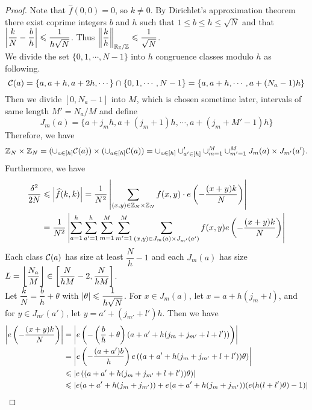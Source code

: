 \begin{proof}
	Note that $ \widehat{f}(0,0) = 0 $, so $ k \neq 0 $. By Dirichlet's approximation theorem there exist coprime integers $ b $ and $ h $ such that $ 1 \leq b \leq h \leq \sqrt{N} $ and that $ \left\vert{\dfrac{k}{N} - \dfrac{b}{h}}\right\vert \leqslant \dfrac{1}{h \sqrt{N}} $. Thus $ \left\| \dfrac{k}{h}\right\|_{{\mathbb R}_{\mathbb Z}/{\mathbb Z}} \leqslant \dfrac{1}{\sqrt{N}} $. \\
	We divide the set $ \{0, 1, \cdots, N-1\} $ into $ h $ congruence classes modulo $ h $ as following. 
	$$ {\mathcal C}(a) = \{a , a+h, a+ 2h, \cdots\} \cap \{0, 1, \cdots, N-1\} = \{a, a+h, \cdots, a+(N_a -1 )h \} $$
	Then we divide $ [0, N_a -1] $ into $ M $, which is chosen sometime later, intervals of same length $ M' = N_a/M $ and define
	$$ J_m(a) = \{a + j_m h , a+ (j_m +1)h, \cdots, a + (j_m + M' -1)h \} $$
	Therefore, we have 
	$$ {\mathbb Z}_N \times {\mathbb Z}_N = (\cup_{a \in [h]} {\mathcal C}(a)) \times (\cup_{a \in [h]} {\mathcal C}(a)) = \cup_{a \in [h]} \cup_{a' \in [h]}' \cup_{m =1}^{M} \cup_{m' = 1}^M J_m(a) \times J_{m'}(a'). $$
	Furthermore, we have 
	\begin{align*}
		\dfrac{\delta^2}{2N} &\leq \abs{\widehat{f}(k,k)} = \dfrac{1}{N^2} \abs{\sum\limits_{(x,y) \in \bbZ_N \times \bbZ_N}  f(x,y) \cdot e\left(-\dfrac{(x+y)k}{N}\right)}\\
		& = \dfrac{1}{N^2} \abs{\sum\limits_{a = 1}^h \sum\limits_{a' = 1} ^h \sum\limits_{m = 1}^M \sum\limits_{m' = 1}^M \sum\limits_{(x,y) \in J_m(a) \times J_{m'}(a')} f(x,y) e\left(-\dfrac{(x+y)k}{N}\right)}
	\end{align*}
	Each class $ {\mathcal C}(a) $ has size at least $ \dfrac{N}{h} -1 $ and each $ J_m(a) $ has size $ L = \left\lfloor{\dfrac{N_a}{M}}\right\rfloor \in \left[\dfrac{N}{hM} - 2, \dfrac{N}{hM} \right] $. \\
	Let $ \dfrac{k}{N} = \dfrac{b}{h} + \theta $ with $ \left\vert{\theta}\right\vert \leqslant \dfrac{1}{h\sqrt{N}} $. For $ x \in J_m(a) $, let $ x = a + h(j_m + l) $, and for $ y \in J_{m'}(a') $, let $ y = a' + (j_{m'} + l')h $. Then we have
	\begin{align*}
	\abs{e\left(-\dfrac{(x+y)k}{N}\right)} 
	&= \abs{e\left(- \left( \dfrac{b}{h} + \theta \right) (a + a' + h(j_m + j_{m'} + l + l'))\right)} 	 \\
	& = \abs{e\left( -\dfrac{(a+a')b}{h}\right) e\left( (a + a' + h(j_m + j_{m'} + l + l')) \theta\right)} \\
	& \leq \abs{ e\left( (a + a' + h(j_m + j_{m'} + l + l')) \theta\right)}\\
	& \leq \abs{e(a+ a' + h(j_m +j_{m'})) + e(a+ a' + h(j_m +j_{m'})) (e(h(l+l')\theta) - 1)} \\

\end{align*}
\end{proof}
